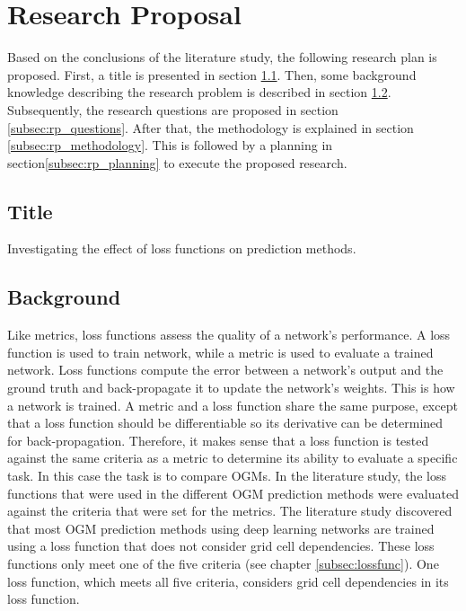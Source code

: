 \section{Research Proposal} \label{sec:res_prop}
Based on the conclusions of the literature study, the following research plan is proposed. First, a title is presented in section \ref{subsec:rp_title}. Then, some background knowledge describing the research problem is described in section \ref{subsec:rp_background}. Subsequently, the research questions are proposed in section \ref{subsec:rp_questions}. After that, the methodology is explained in section \ref{subsec:rp_methodology}. This is followed by a planning in section\ref{subsec:rp_planning} to execute the proposed research. 

\subsection{Title} \label{subsec:rp_title}
Investigating the effect of loss functions on  prediction methods.

\subsection{Background} \label{subsec:rp_background}
Like metrics, loss functions assess the quality of a network's performance. A loss function is used to train network, while a metric is used to evaluate a trained network. Loss functions compute the error between a network's output and the ground truth and back-propagate it to update the network's weights. This is how a network is trained. A metric and a loss function share the same purpose, except that a loss function should be differentiable so its derivative can be determined for back-propagation. Therefore, it makes sense that a loss function is tested against the same criteria as a metric to determine its ability to evaluate a specific task. In this case the task is to compare \glspl{OGM}. In the literature study, the loss functions that were used in the different \gls{OGM} prediction methods were evaluated against the criteria that were set for the metrics. The literature study discovered that most \gls{OGM} prediction methods using deep learning networks are trained using a loss function that does not consider grid cell dependencies. These loss functions only meet one of the five criteria (see chapter \ref{subsec:lossfunc}). One loss function, which meets all five criteria, considers grid cell dependencies in its loss function. \\

